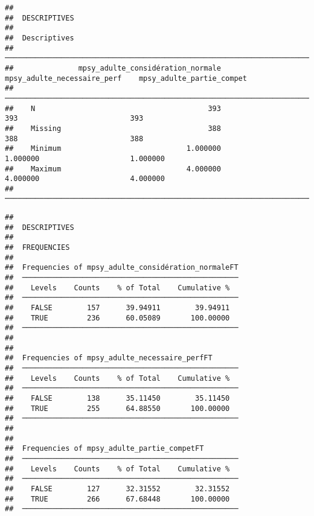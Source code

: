 \documentclass[
]{article}
\begin{document}
\begin{verbatim}
## 
##  DESCRIPTIVES
## 
##  Descriptives                                                                                                 
##  ──────────────────────────────────────────────────────────────────────────────────────────────────────────── 
##               mpsy_adulte_considération_normale    mpsy_adulte_necessaire_perf    mpsy_adulte_partie_compet   
##  ──────────────────────────────────────────────────────────────────────────────────────────────────────────── 
##    N                                        393                            393                          393   
##    Missing                                  388                            388                          388   
##    Minimum                             1.000000                       1.000000                     1.000000   
##    Maximum                             4.000000                       4.000000                     4.000000   
##  ────────────────────────────────────────────────────────────────────────────────────────────────────────────
\end{verbatim}

\begin{verbatim}
## 
##  DESCRIPTIVES
## 
##  FREQUENCIES
## 
##  Frequencies of mpsy_adulte_considération_normaleFT 
##  ────────────────────────────────────────────────── 
##    Levels    Counts    % of Total    Cumulative %   
##  ────────────────────────────────────────────────── 
##    FALSE        157      39.94911        39.94911   
##    TRUE         236      60.05089       100.00000   
##  ────────────────────────────────────────────────── 
## 
## 
##  Frequencies of mpsy_adulte_necessaire_perfFT       
##  ────────────────────────────────────────────────── 
##    Levels    Counts    % of Total    Cumulative %   
##  ────────────────────────────────────────────────── 
##    FALSE        138      35.11450        35.11450   
##    TRUE         255      64.88550       100.00000   
##  ────────────────────────────────────────────────── 
## 
## 
##  Frequencies of mpsy_adulte_partie_competFT         
##  ────────────────────────────────────────────────── 
##    Levels    Counts    % of Total    Cumulative %   
##  ────────────────────────────────────────────────── 
##    FALSE        127      32.31552        32.31552   
##    TRUE         266      67.68448       100.00000   
##  ──────────────────────────────────────────────────
\end{verbatim}
\end{document}
